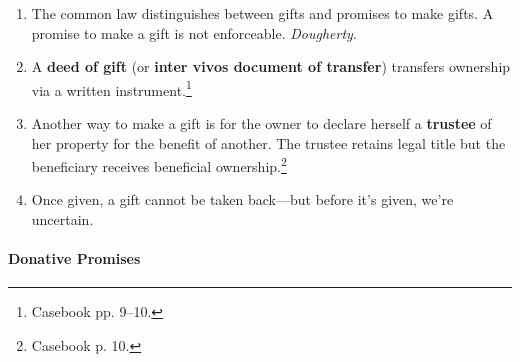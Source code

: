 \begin{enumerate}
    \item The common law distinguishes between gifts and promises to make 
    gifts. A promise to make a gift is not enforceable. \emph{Dougherty}.
    \item A \textbf{deed of gift} (or \textbf{inter vivos document of 
    transfer}) transfers ownership via a written instrument.\footnote{Casebook 
    pp. 9--10.}
    \item Another way to make a gift is for the owner to declare herself a 
    \textbf{trustee} of her property for the benefit of another. The trustee 
    retains legal title but the beneficiary receives beneficial 
    ownership.\footnote{Casebook p. 10.}
    \item Once given, a gift cannot be taken back---but before it's given, 
    we're uncertain.
\end{enumerate}

\paragraph{Donative Promises}

